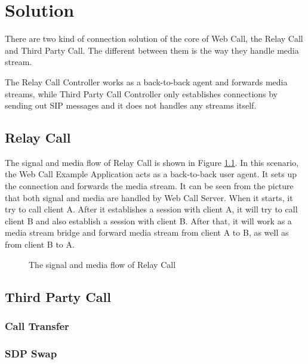 \chapter{Solution}
\label{sec:Solution}

There are two kind of connection solution of the core of Web Call, the Relay Call and Third Party Call. The different between them is the way they handle media stream.

The Relay Call Controller works as a back-to-back agent and forwards media streams, while Third Party Call Controller only establishes connections by sending out SIP messages and it does not handles any streams itself. 

\section{Relay Call}
\label{sec:Solution:RelayCall}

The signal and media flow of Relay Call is shown in Figure \ref{fig:TheSignalAndMediaFlowOfRelayCall}. In this scenario, the Web Call Example Application acts as a back-to-back user agent. It sets up the connection and forwards the media stream. It can be seen from the picture that both signal and media are handled by Web Call Server. When it starts, it try to call client A. After it establishes a session with client A, it will try to call client B and also establish a session with client B. After that, it will work as a media stream bridge and forward media stream from client A to B, as well as from client B to A.


\begin{figure}[!hbtp]
\centering
{}
\caption{The signal and media flow of Relay Call}
\label{fig:TheSignalAndMediaFlowOfRelayCall}
\end{figure}



\section{Third Party Call}
\label{sec:Solution:ThirdPartyCall}


\subsection{Call Transfer}
\label{sec:Solution:ThirdPartyCall:CallTransfer}


\subsection{SDP Swap}
\label{sec:Solution:ThirdPartyCall:SDPSwep}


